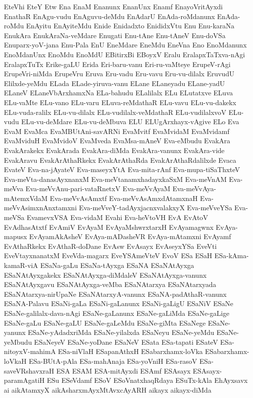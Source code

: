{EteVhi
EteY
Etw
Ena
EnaM
Enanunx
EnanUnx
Enamf
EnayoVritAyxdi
EnathaR
EnAgu-vudu
EnAguvu-deMdu
EnAdarU
EnAda-roMdanunx
EnAda-roMdu
EnAyitu
EnAyiteMdu
Enide
Enidadxto
EnididxVtu
Enu
Enu-karaNa
EnukAra
EnukAraNa-veMdare
Enugati
Enu-tAne
Enu-tAneV
Enu-doVSa
Enuparx-yoV-jana
Enu-Pala
EnU
EneMdare
EneMdu
EneVna
Eno
EnoMdanunx
EnoMdanUnx
EnoMdu
EnoMdU
EBitirxBi
EBoyxV
Eralu
EralapxTaTxva-nAgi
EralapxTuTx
Erike-gaLU
Erida
Eri-baru-vanu
Eri-ru-vaMteye
ErupeV-rAgi
ErupeVri-niMda
ErupeVru
Eruva
Eru-vadu
Eru-vavu
Eru-vu-dilalx
EruvudU
Elilxde-yeMdu
ELada
ELade-yiruva-vanu
ELane
ELaneyadu
ELane-yadU
ELaneV
ELaneVbArxhamxNa
ELa-bahudu
ELalilalx
ELu
ELutatxve
ELuva
ELu-vaMte
ELu-vano
ELu-varu
ELuva-reMdathaR
ELu-vavu
ELu-vu-dakekx
ELu-vuda-ralilx
ELu-vu-dilalx
ELu-vudilalx-veMdathaR
ELu-vudilalxvoV
ELu-vudu
ELu-vu-deMdare
ELu-vu-deMbuva
ELU
ELUgArxhayx-vAgive
ELo
Eva
EvaM
EvaMca
EvaMBUtAni-savARNi
EvaMvitf
EvaMvidaM
EvaMvidamf
EvaMviduH
EvaMvidoV
EvaMveda
EvaMsa-mAneV
Eva-eMbudu
EvakAra
EvakArakekx
EvakArada
EvakAra-diMda
EvakAra-vanunx
EvakAra-vide
EvakAravu
EvakArAthaRkekx
EvakArAthaRda
EvakArAthaRdalilxde
Evaca
EvateV
Eva-na-jAyateV
Eva-maseyxYtA
Eva-mita-rAnf
Eva-mupa-tiSaThxteV
Eva-meVta-danasAyxnanxM
Eva-meVtanamxhadayxkaSxM
Eva-meVnAM
Eva-meVva
Eva-meVvAnu-pari-vataRnetxV
Eva-meVvAyaM
Eva-meVvAya-mAtemxVdaM
Eva-meVvAsAmxtf
Eva-meVvAsAmxdAtamxnaH
Eva-meVvAsimxnAnxtamxni
Eva-meVveY-tadAyxjacnxvalakxyX
Eva-meVveYSa
Eva-meVSa
EvamevxVSA
Eva-vidaM
Evahi
Eva-heVtoVH
EvA
EvAtoV
EvAdhasAtxtf
EvAmiV
EvAyaM
EvAyaMshwrxtarxH
EvAyamagwnx
EvAya-mapusx
EvAyamAkAsheV
EvAya-mADasheVR
EvAya-mAtamxni
EvAyamf
EvAthaRkekx
EvAthaR-doDane
EvAsw
EvAsayx
EvAseyxYSa
EveVti
EveVtayxnanatxM
EveVda-magarx
EveYSAmeVteV
EvoV
ESa
ESaH
ESa-kAma-kamaR-viA
ESaNa-gaLu
ESaNa-tAyxga
ESaNA
ESaNAtAyxga
ESaNAtAyxgakekx
ESaNAtAyxga-diMdaleV
ESaNAtAyxga-vanunx
ESaNAtAyxgavu
ESaNAtAyxga-veMba
ESaNAtarxya
ESaNAtarxyada
ESaNAtarxya-nirUpaNe
ESaNAtarxyA-vanunx
ESaNA-padAthaR-vanunx
ESaNA-Palavu
ESaNi-gaLa
ESaNi-gaLanunx
ESaNi-gaLigU
ESaNiV
ESaNe
ESaNe-galilalx-dava-nAgi
ESaNe-gaLanunx
ESaNe-gaLiMda
ESaNe-gaLige
ESaNe-gaLu
ESaNe-gaLU
ESaNe-gaLeMdu
ESaNe-giMta
ESaNege
ESaNe-yanunx
ESaNe-yAdadxriMda
ESaNe-yilalxda
ESaNeyu
ESaNe-yeMdu
ESaNe-yeMbudu
ESaNeyeV
ESaNe-yoDane
ESaNeV
ESata
ESa-tapati
ESateV
ESa-nitoyxV-mahimA
ESa-niVlaH
ESapanAthxH
ESabarxhamx-loVka
ESabarxhamx-loVkaH
ESa-BUtA-pAla
ESa-mahAnaja
ESa-yoVniH
ESa-rasoV
ESa-saveVRshavxraH
ESA
ESAM
ESA-mitAyxdi
ESAmf
ESAsayx
ESAsayx-paramAgatiH
ESu
ESeVdamf
ESoV
ESoVnatxhaqRdaya
ESuTx-kAla
EhAyxsavx
ai
aikAtamxyX
aikAsharxmAyxMtAvxcAyARH
aikayx
aikayx-diMda
}
